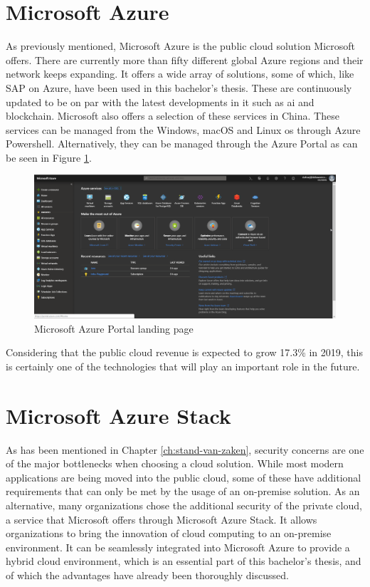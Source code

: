 \section{Microsoft Azure}
As previously mentioned, Microsoft Azure is the public cloud solution Microsoft offers. 
There are currently more than fifty different global Azure regions and their network keeps expanding. 
It offers a wide array of solutions, some of which, like SAP on Azure, have been used in this bachelor's thesis. 
These are continuously updated to be on par with the latest developments in \acrshort{it} such as \acrfull{ai} and blockchain. 
Microsoft also offers a selection of these services in China. 
These services can be managed from the Windows, macOS  and Linux \acrshort{os} through Azure Powershell. 
Alternatively, they can be managed through the Azure Portal as can be seen in Figure \ref{fig:Azure_Portal}.

\begin{figure}[h]
	\captionsetup{width=0.8\linewidth}
	\includegraphics[width=0.9\linewidth]{img/Toekomstvisie/Azure0.png}
	\centering
	\caption[Azure Portal]{Microsoft Azure Portal landing page}
	\label{fig:Azure_Portal}
\end{figure}
Considering that the public cloud revenue is expected to grow 17.3\% in 2019, this is certainly one of the technologies that will play an important role in the future. \autocite{Ng2018}

\section{Microsoft Azure Stack}
As has been mentioned in Chapter \ref{ch:stand-van-zaken}, security concerns are one of the major bottlenecks when choosing a cloud solution. 
While most modern applications are being moved into the public cloud, some of these have additional requirements that can only be met by the usage of an on-premise solution. 
As an alternative, many organizations chose the additional security of the private cloud, a service that Microsoft offers through Microsoft Azure Stack. 
It allows organizations to bring the innovation of cloud computing to an on-premise environment.
It can be seamlessly integrated into Microsoft Azure to provide a hybrid cloud environment, which is an essential part of this bachelor's thesis, and of which the advantages have already been thoroughly discussed.

